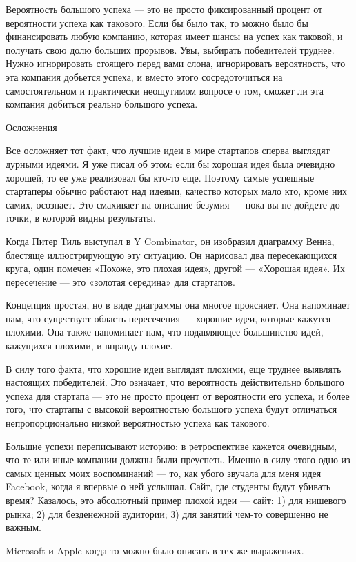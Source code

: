 \documentclass[ebook,12pt,oneside,openany]{memoir}
\begin{document}
Вероятность большого успеха — это не просто фиксированный процент от
вероятности успеха как такового. Если бы было так, то можно было бы
финансировать любую компанию, которая имеет шансы на успех как
таковой, и получать свою долю больших прорывов. Увы, выбирать
победителей труднее. Нужно игнорировать стоящего перед вами слона,
игнорировать вероятность, что эта компания добьется успеха, и вместо
этого сосредоточиться на самостоятельном и практически неощутимом
вопросе о том, сможет ли эта компания добиться реально большого
успеха.

Осложнения

Все осложняет тот факт, что лучшие идеи в мире стартапов сперва
выглядят дурными идеями. Я уже писал об этом: если бы хорошая идея
была очевидно хорошей, то ее уже реализовал бы кто-то еще. Поэтому
самые успешные стартаперы обычно работают над идеями, качество которых
мало кто, кроме них самих, осознает. Это смахивает на описание безумия
— пока вы не дойдете до точки, в которой видны результаты.

Когда Питер Тиль выступал в Y Combinator, он изобразил диаграмму
Венна, блестяще иллюстрирующую эту ситуацию. Он нарисовал два
пересекающихся круга, один помечен «Похоже, это плохая идея», другой —
«Хорошая идея». Их пересечение — это «золотая середина» для стартапов.

Концепция простая, но в виде диаграммы она многое проясняет. Она
напоминает нам, что существует область пересечения — хорошие идеи,
которые кажутся плохими. Она также напоминает нам, что подавляющее
большинство идей, кажущихся плохими, и вправду плохие.

В силу того факта, что хорошие идеи выглядят плохими, еще труднее
выявлять настоящих победителей. Это означает, что вероятность
действительно большого успеха для стартапа — это не просто процент от
вероятности его успеха, и более того, что стартапы с высокой
вероятностью большого успеха будут отличаться непропорционально низкой
вероятностью успеха как такового.

Большие успехи переписывают историю: в ретроспективе кажется
очевидным, что те или иные компании должны были преуспеть. Именно в
силу этого одно из самых ценных моих воспоминаний — то, как убого
звучала для меня идея Facebook, когда я впервые о ней услышал. Сайт,
где студенты будут убивать время? Казалось, это абсолютный пример
плохой идеи — сайт: 1) для нишевого рынка; 2) для безденежной
аудитории; 3) для занятий чем-то совершенно не важным.

Microsoft и Apple когда-то можно было описать в тех же выражениях.
\end{document}

